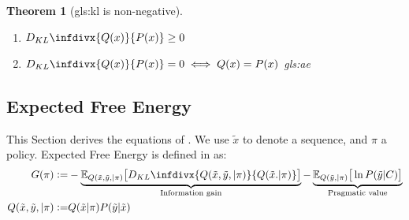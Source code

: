 \documentclass[]{article}
\newcommand{\defeq}{\vcentcolon=}
\newcommand{\infdiv}{D_{KL}\infdivx}
\newtheorem{thm}{Theorem}
\begin{document}
\begin{thm}[\gls{gls:kl} is non-negative]\label{thm:kl:nn}
	\begin{enumerate}
		\leavevmode
		\item 	$\infdiv{Q(x)}{P(x)}\ge 0$
		\item 	$\infdiv{Q(x)}{P(x)}= 0 \iff Q(x)=P(x)$ \gls{gls:ae}
	\end{enumerate}
\end{thm}
\subsection{Expected Free Energy}
This Section derives the equations of \cite[Section 2.6]{parr2022Active}. We use $\tilde{x}$ to denote a sequence, and $\pi$ a policy.
\cite{millidge2021whence}
Expected Free Energy is defined in \cite[Section 2.6]{parr2022Active} as:
\begin{align*}
	G(\pi) \defeq& -\underbrace{\mathbb{E}_{Q(\tilde{x},\tilde{y},\vert \pi)}\big[\infdiv{Q(\tilde{x},\tilde{y},\vert \pi)}{Q(\tilde{x}.\vert \pi)}\big]}_\text{Information gain}  - \underbrace{\mathbb{E}_{Q(\tilde{y},\vert \pi)}\big[\ln{P(\tilde{y}\vert C)}\big]}_\text{Pragmatic value}\\
	Q(\tilde{x},\tilde{y},\vert \pi) \defeq& Q(\tilde{x}\vert \pi)P(\tilde{y}\vert\tilde{x})
\end{align*}
\end{document}
